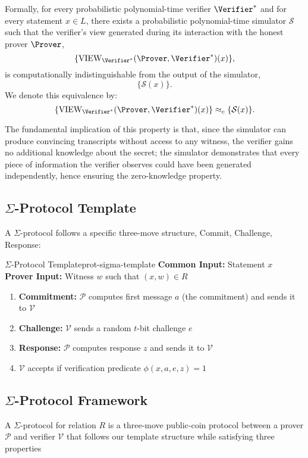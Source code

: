 \noindent Formally, for every probabilistic polynomial-time verifier $\Verifier^*$ and for every statement $x \in L$, there exists a probabilistic polynomial-time simulator $\mathcal{S}$ such that the verifier's view generated during its interaction with the honest prover $\Prover$,
\[
\{\text{VIEW}_{\Verifier^*}(\Prover, \Verifier^*)(x)\},
\]
is computationally indistinguishable from the output of the simulator,
\[
\{\mathcal{S}(x)\}.
\]
We denote this equivalence by:
\[
\{\text{VIEW}_{\Verifier^*}(\Prover, \Verifier^*)(x)\} \approx_c \{\mathcal{S}(x)\}.
\]

\noindent The fundamental implication of this property is that, since the simulator can produce convincing transcripts without access to any witness, the verifier gains no additional knowledge about the secret; the simulator demonstrates that every piece of information the verifier observes could have been generated independently, hence ensuring the zero-knowledge property.





\subsection{$\Sigma$-Protocol Template}
A $\Sigma$-protocol follows a specific three-move structure, Commit, Challenge, Response:

\begin{protocol}{$\Sigma$-Protocol Template}{prot-sigma-template}
\textbf{Common Input:} Statement $x$\\
\textbf{Prover Input:} Witness $w$ such that $(x,w) \in R$
    \begin{enumerate}
        \item \textbf{Commitment:} $\mathcal{P}$ computes first message $a$ (the commitment) and sends it to $\mathcal{V}$
        \item \textbf{Challenge:} $\mathcal{V}$ sends a random $t$-bit challenge $e$
        \item \textbf{Response:} $\mathcal{P}$ computes response $z$ and sends it to $\mathcal{V}$
        \item $\mathcal{V}$ accepts if verification predicate $\phi(x,a,e,z)=1$
    \end{enumerate}
\end{protocol}


\subsection{$\Sigma$-Protocol Framework}
A $\Sigma$-protocol for relation $R$ is a three-move public-coin protocol between a prover $\mathcal{P}$ and verifier $\mathcal{V}$ that follows our template structure while satisfying three properties

